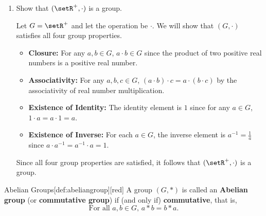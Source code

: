 \begin{enumerate}
\begin{subprove}
\begin{itemize}
    \end{itemize}
    Since the existence of identity and existence of inverse properties are not satisfied, it follows that \((\setR^{+}, +)\) is not a group.
  \end{subprove}
  \item Show that \((\setR^{+}, \cdot)\) is a group.
  \begin{subprove}
    Let \(G = \setR^{+}\) and let the operation be \(\cdot\).
    We will show that \((G, \cdot)\) satisfies all four group properties.
    \begin{itemize}
      \item \textbf{Closure:} For any \(a, b \in G\), \(a \cdot b \in G\) since the product of two positive real numbers is a positive real number.
      \item \textbf{Associativity:} For any \(a, b, c \in G\), \((a \cdot b) \cdot c = a \cdot (b \cdot c)\) by the associativity of real number multiplication.
      \item \textbf{Existence of Identity:} The identity element is \(1\) since for any \(a \in G\), \(1 \cdot a = a \cdot 1 = a\).
      \item \textbf{Existence of Inverse:} For each \(a \in G\), the inverse element is \(a^{-1} = \frac{1}{a}\) since \(a \cdot a^{-1} = a^{-1} \cdot a = 1\).
    \end{itemize}
    Since all four group properties are satisfied, it follows that \((\setR^{+}, \cdot)\) is a group.
  \end{subprove}
\end{enumerate}



\begin{define}{Abelian Groups}[def:abeliangroup][red]
  A group \((G, *)\) is called an \textbf{Abelian group} 
  (or \textbf{commutative group}) if (and only if) \textbf{commutative}, that is,
  \[
  \text{For all } a, b \in G, \, a * b = b * a.
  \]
\end{define}

